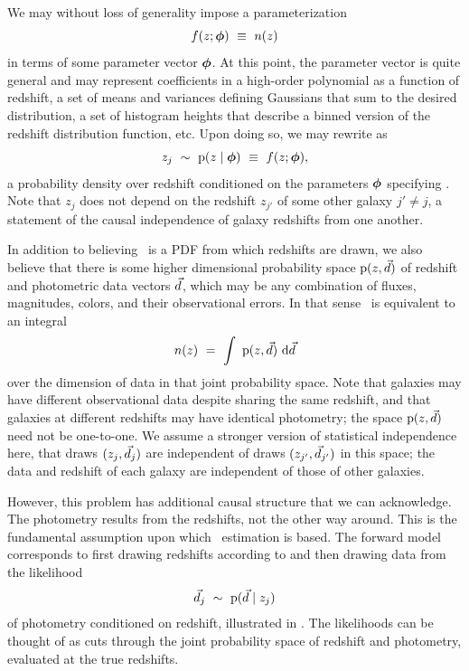 We may without loss of generality impose a parameterization
\begin{equation}
\eqlabel{eqn:fz}
f(z; \ndphi)\ \equiv\ n(z)
\end{equation}
in terms of some parameter vector ${\boldsymbol{\phi}}$.
At this point, the parameter vector is quite general and may represent coefficients in a high-order polynomial as a function of redshift, a set of means and variances defining Gaussians that sum to the desired distribution, a set of histogram heights that describe a binned version of the redshift distribution function, etc.
Upon doing so, we may rewrite  as 
\begin{equation}
\eqlabel{eqn:pz}
z_{j}\ \sim\ \pr{z \gvn \ndphi}\ \equiv\ f(z; \ndphi),
\end{equation}
a probability density over redshift conditioned on the parameters ${\boldsymbol{\phi}}$ specifying \nz.
Note that $z_{j}$ does not depend on the redshift $z_{j'}$ of some other galaxy $j' \neq j$, a statement of the causal independence of galaxy redshifts from one another.

In addition to believing \nz\ is a PDF from which redshifts are drawn, we also believe that there is some higher dimensional probability space $\mathrm{p}(z, \vec{d})$ of redshift and photometric data vectors $\vec{d}$, which may be any combination of fluxes, magnitudes, colors, and their observational errors.
In that sense \nz\ is equivalent to an integral
\begin{equation}
\eqlabel{eqn:integral}
n(z)\ =\ \integral{\pr{z, \data}}{\data}
\end{equation}
over the dimension of data in that joint probability space.
Note that galaxies may have different observational data despite sharing the same redshift, and that galaxies at different redshifts may have identical photometry; the space $\mathrm{p}(z, \vec{d})$ need not be one-to-one.
We assume a stronger version of statistical independence here, that draws $(z_{j}, \vec{d}_{j})$ are independent of draws $(z_{j'}, \vec{d}_{j'})$ in this space; the data and redshift of each galaxy are independent of those of other galaxies.

However, this problem has additional causal structure that we can acknowledge.
The photometry results from the redshifts, not the other way around.
This is the fundamental assumption upon which \pz\ estimation is based.
The forward model corresponds to first drawing redshifts according to  and then drawing data from the likelihood
\begin{equation}
\eqlabel{eqn:pzpdf}
\data_{j}\ \sim\ \pr{\data \gvn z_{j}}
\end{equation}
of photometry conditioned on redshift, illustrated in .
The likelihoods can be thought of as cuts through the joint probability space of redshift and photometry, evaluated at the true redshifts.

